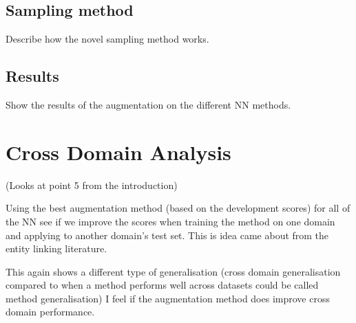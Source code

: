 \subsection{Sampling method}
Describe how the novel sampling method works.
\subsection{Results}
Show the results of the augmentation on the different NN methods.
\section{Cross Domain Analysis}
(Looks at point 5 from the introduction)

Using the best augmentation method (based on the development scores) for all of the NN see if we improve the scores when training the method on one domain and applying to another domain's test set. This is idea came about from the entity linking literature.

This again shows a different type of generalisation (cross domain generalisation compared to when a method performs well across datasets could be called method generalisation) I feel if the augmentation method does improve cross domain performance.